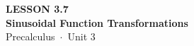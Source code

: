 \documentclass[aspectratio=169, 11pt]{beamer}
\begin{document}
{
\begin{frame}[plain]
  \vspace{2.8cm}\hspace{0.55cm}%
  \begin{minipage}{0.9\textwidth}
    {\color{goldacc}\bfseries\small LESSON 3.7}\\[0.5cm]
    {\color{white}\bfseries\LARGE Sinusoidal Function Transformations}\\[1.2cm]
    {\color{skymid}\small Precalculus~$\cdot$~Unit 3}
  \end{minipage}
\end{frame}
}

\begin{frame}[t, plain]
\end{frame}
\end{document}
